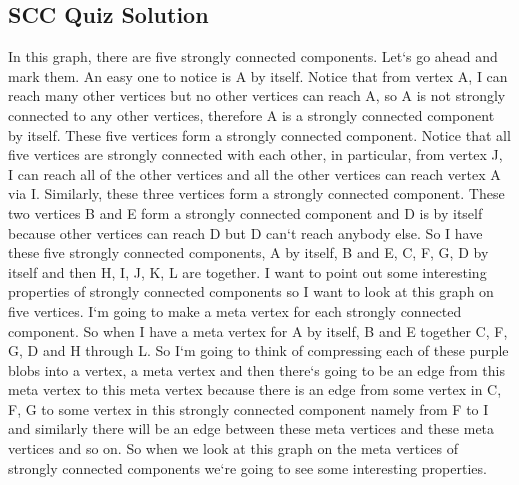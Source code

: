 \subsection{SCC Quiz Solution}
In this graph, there are five strongly connected components.
Let`s go ahead and mark them.
An easy one to notice is A by itself.
Notice that from vertex A, I can reach many other vertices but no other vertices can reach A, so A is not strongly connected to any other vertices, therefore A is a strongly connected component by itself.
These five vertices form a strongly connected component.
Notice that all five vertices are strongly connected with each other, in particular, from vertex J, I can reach all of the other vertices and all the other vertices can reach vertex A via I\@.
Similarly, these three vertices form a strongly connected component.
These two vertices B and E form a strongly connected component and D is by itself because other vertices can reach D but D can`t reach anybody else.
So I have these five strongly connected components, A by itself, B and E, C, F, G, D by itself and then H, I, J, K, L are together.
I want to point out some interesting properties of strongly connected components so I want to look at this graph on five vertices.
I`m going to make a meta vertex for each strongly connected component.
So when I have a meta vertex for A by itself, B and E together C, F, G, D and H through L\@.
So I`m going to think of compressing each of these purple blobs into a vertex, a meta vertex and then there`s going to be an edge from this meta vertex to this meta vertex because there is an edge from some vertex in C, F, G to some vertex in this strongly connected component namely from F to I and similarly there will be an edge between these meta vertices and these meta vertices and so on.
So when we look at this graph on the meta vertices of strongly connected components we`re going to see some interesting properties.

